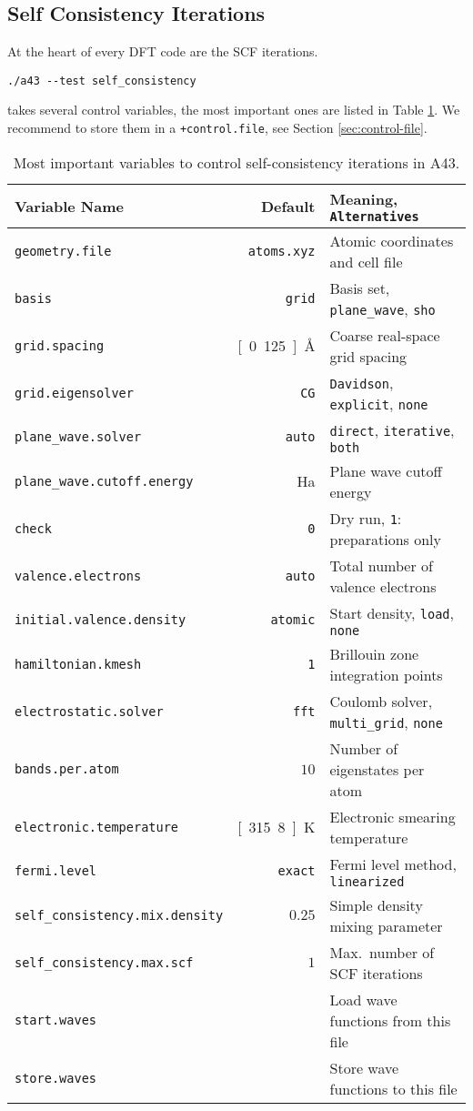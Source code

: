 \documentclass[oribibl]{llncs}
\newcommand{\ttt}[1]{\texttt{#1}}
\newcommand{\codename}{A43}
\begin{document}
\subsection{Self Consistency Iterations} \label{sec:self-consistency}
%
At the heart of every \ac{DFT} code are the \ac{SCF} iterations.
\begin{verbatim}
./a43 --test self_consistency
\end{verbatim}
takes several control variables, the most important ones are listed in Table \ref{tab:main-scf-variables}.
We recommend to store them in a \ttt{+control.file}, see Section \ref{sec:control-file}.
%
\begin{table}[h]
\caption[Main Variables]{
Most important variables to control self-consistency iterations in \codename{}.
} \label{tab:main-scf-variables}
\centering
\begin{tabular}{|l|r|l|}
\hline
  Variable Name & Default & Meaning, \ttt{Alternatives} \\
\hline
  \ttt{geometry.file} & \ttt{atoms.xyz}   & Atomic coordinates and cell file \\
  \ttt{basis}         & \ttt{grid}        & Basis set, \ttt{plane\_wave}, \ttt{sho} \\ 
  \ttt{grid.spacing}  & \unit[0.125]{\AA} & Coarse real-space grid spacing \\
  \ttt{grid.eigensolver} & \ttt{CG}       & \ttt{Davidson}, \ttt{explicit}, \ttt{none} \\
  \ttt{plane\_wave.solver} & \ttt{auto}   & \ttt{direct}, \ttt{iterative}, \ttt{both} \\ 
  \ttt{plane\_wave.cutoff.energy} & \unit[11]{Ha} & Plane wave cutoff energy \\
  \ttt{check}         & \ttt{0}           & Dry run, \ttt{1}: preparations only \\
  \ttt{valence.electrons} & \ttt{auto}    & Total number of valence electrons \\
  \ttt{initial.valence.density} & \ttt{atomic} & Start density, \ttt{load}, \ttt{none} \\
  \ttt{hamiltonian.kmesh} & \ttt{1}       & Brillouin zone integration points \\
  \ttt{electrostatic.solver} & \ttt{fft}  & Coulomb solver, \ttt{multi\_grid}, \ttt{none} \\
  \ttt{bands.per.atom} & $10$ 			  & Number of eigenstates per atom \\
  \ttt{electronic.temperature} & \unit[315.8]{K} & Electronic smearing temperature \\
  \ttt{fermi.level}   & \ttt{exact}       & Fermi level method, \ttt{linearized} \\
  \ttt{self\_consistency.mix.density} & $0.25$ & Simple density mixing parameter \\
  \ttt{self\_consistency.max.scf} & $1$   & Max.~number of \ac{SCF} iterations \\
  \ttt{start.waves}   &                   & Load wave functions from this file \\
  \ttt{store.waves}   &                   & Store wave functions to this file \\
\hline
\end{tabular}
\end{table}
\end{document}
